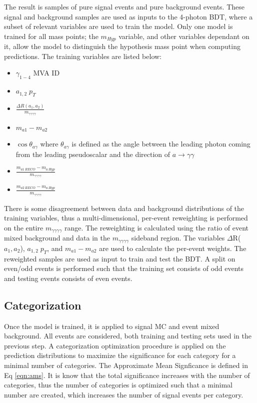 \documentclass[12pt]{article}
\begin{document}
The result is samples of pure signal events and pure background events. These signal and background samples are used as inputs to the 4-photon BDT, where a subset of relevant variables are used to train the model. Only one model is trained for all mass points; the $m_{Hyp}$ variable, and other variables dependant on it, allow the model to distinguish the hypothesis mass point when computing predictions. The training variables are listed below:\par

\begin{itemize}
   \item $\gamma_{1-4}$ MVA ID
   \item $a_{1,2}\; p_T$
   \item $\frac{\Delta R(a_{1}, a_{2})}{m_{\gamma\gamma\gamma\gamma}}$
   \item $m_{a1} - m_{a2}$
   \item $\cos\theta_{a\gamma}$ where $\theta_{a\gamma}$ is defined as the angle between the leading photon coming from the leading pseudoscalar and the direction of $a\rightarrow\gamma\gamma$
   \item $\frac{m_{a1\,RECO} - m_{a\, Hyp}}{m_{\gamma\gamma\gamma\gamma}}$
   \item $\frac{m_{a2\,RECO} - m_{a\, Hyp}}{m_{\gamma\gamma\gamma\gamma}}$
\end{itemize}


There is some disagreement between data and background distributions of the training variables, thus a multi-dimensional, per-event reweighting is performed on the entire $m_{\gamma\gamma\gamma\gamma}$ range. The reweighting is calculated using the ratio of event mixed background and data in the $m_{\gamma\gamma\gamma\gamma}$ sideband region. The variables $\Delta$R($a_1,a_2$), $a_{1,2}\; p_T$, and $m_{a1} - m_{a2}$ are used to calculate the per-event weights. The reweighted samples are used as input to train and test the BDT. A split on even/odd events is performed such that the training set consists of odd events and testing events consists of even events.\par


\subsection{Categorization}
Once the model is trained, it is applied to signal MC and event mixed background. All events are considered, both training and testing sets used in the previous step. A categorization optimization procedure is applied on the prediction distributions to maximize the significance for each category for a minimal number of categories. The Approximate Mean Signficance is defined in Eq \ref{eqn:ams}. It is know that the total significance increases with the number of categories, thus the number of categories is optimized such that a minimal number are created, which increases the number of signal events per category.\par
\end{document}
